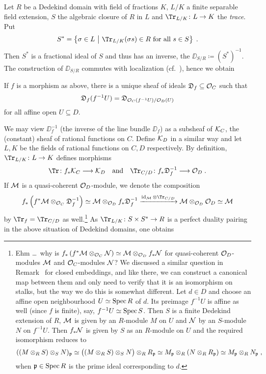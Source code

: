 \documentclass[a4paper,parskip=half,numbers=enddot, DIV=12]{scrreprt}
\begin{document}
Let $R$ be a Dedekind domain with field of fractions $K$, $L/K$ a finite separable field extension, $S$ the algebraic closure of $R$ in $L$ and $\Tr_{L/K}\colon L\morphism K$ the \emph{trace}. Put
\begin{align*}
	S^*=\left\{\sigma\in L\st \Tr_{L/K}(\sigma s)\in R\text{ for all }s\in S\right\}\;.
\end{align*}
Then $S^*$ is a fractional ideal of $S$ and thus has an inverse, the  $\DD_{S/R}\coloneqq (S^*)^{-1}$. The construction of $\DD_{S/R}$ commutes with localization (cf.\ \cite[Ch.\ III, (2.2)]{NEUKIRCH}), hence we obtain
\begin{fact}
	If $f$ is a morphism as above, there is a unique sheaf of ideals $\mathfrak{D}_f\subseteq \mathcal{O}_C$ such that 
	\begin{align*}
		\mathfrak{D}_f(f^{-1}U)=\mathfrak{D}_{\mathcal{O}_C(f^{-1}U)/\mathcal{O}_D(U)}
	\end{align*}
	for all affine open $U\subseteq D$.
\end{fact}
We may view $\DD_f^{-1}$ (the inverse of the line bundle $\DD_f$) as a subsheaf of $\mathcal{K}_C$, the (constant) sheaf of rational functions on $C$. Define $\mathcal{K}_D$ in a similar way and let $L,K$ be the fields of rational functions on $C,D$ respectively. By definition, $\Tr_{L/K}\colon L\morphism K$ defines morphisms
\begin{align*}
	\Tr\colon f_*\Kk_C\morphism\Kk_D\quad\text{and}\quad\Tr_{C/D}\colon f_*\DD_f^{-1}\morphism \Oo_D\;.
\end{align*}
If $\mathcal{M}$ is a quasi-coherent $\mathcal{O}_D$-module, we denote the composition
\begin{align*}
	f_*\left(f^*\Mm\otimes_{\Oo_C}\DD_f^{-1}\right)\simeq \Mm\otimes_{\Oo_D}f_*\DD_f^{-1}\xrightarrow{\id_\Mm\otimes \Tr_{C/D}}\Mm\otimes_{\Oo_D}\Oo_D\simeq \Mm
\end{align*}
by $\Tr_f=\Tr_{C/D}$ as well.\footnote{Ehm \ldots\ why is $f_*\left(f^*\mathcal{M}\otimes_{\mathcal{O}_C}\mathcal{N}\right)\simeq \mathcal{M}\otimes_{\mathcal{O}_D}f_*\mathcal{N}$ for quasi-coherent $\mathcal{O}_D$-modules $\mathcal{M}$ and $\mathcal{O}_C$-modules $\mathcal{N}$? We discussed a similar question in Remark~ for closed embeddings, and like there, we can construct a canonical map between them and only need to verify that it is an isomorphism on stalks, but the way we do this is somewhat different. Let $d\in D$ and choose an affine open neighbourhood $U\simeq \operatorname{Spec} R$ of $d$. Its preimage $f^{-1}U$ is affine as well (since $f$ is finite), say, $f^{-1}U\simeq \operatorname{Spec} S$. Then $S$ is a finite Dedekind extension of $R$, $\mathcal{M}$ is given by an $R$-module $M$ on $U$ and $\mathcal{N}$ by an $S$-module $N$ on $f^{-1}U$. Then $f_*\mathcal{N}$ is given by $S$ as an $R$-module on $U$ and the required isomorphism reduces to
\begin{align*}
	((M\otimes_RS)\otimes_SN)_{\mathfrak{p}}\simeq \big((M\otimes_RS)\otimes_SN\big)\otimes_RR_{\mathfrak{p}}\simeq M_{\mathfrak{p}}\otimes_R(N\otimes_RR_{\mathfrak{p}})\simeq M_{\mathfrak{p}}\otimes_RN_{\mathfrak{p}}\;,
\end{align*}
when $\mathfrak{p}\in\operatorname{Spec} R$ is the prime ideal corresponding to $d$.} As $\Tr_{L/K}\colon S\times S^*\morphism R$ is a perfect duality pairing in the above situation of Dedekind domains, one obtains
\end{document}
